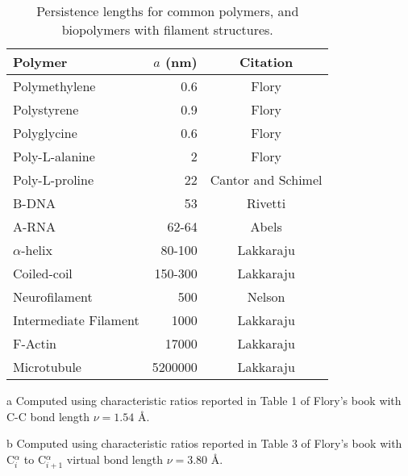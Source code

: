 \begin{table}[htbp]
\begin{center}
\begin{threeparttable}
\begin{tabular}{l|r|c}
\hline
Polymer               & $a$ (nm) & Citation  \\ \hline
Polymethylene         & 0.6      & Flory\tnote{a}      \\  
Polystyrene           & 0.9      & Flory\tnote{a}      \\
Polyglycine           & 0.6      & Flory \tnote{b}     \\
Poly-L-alanine        & 2        & Flory \tnote{b}     \\
Poly-L-proline        & 22       & Cantor and Schimel \cite{cantor1980} \\
B-DNA                 & 53       & Rivetti \cite{rivetti1996}     \\
A-RNA                 & 62-64    & Abels     \cite{abels2005}     \\
$\alpha$-helix        & 80-100   & Lakkaraju \cite{lakkaraju2009} \\
Coiled-coil           & 150-300  & Lakkaraju \cite{lakkaraju2009} \\
Neurofilament         & 500      & Nelson    \cite{nelson2004}    \\
Intermediate Filament & 1000     & Lakkaraju \cite{lakkaraju2009} \\
F-Actin               & 17000    & Lakkaraju \cite{lakkaraju2009} \\
Microtubule           & 5200000  & Lakkaraju \cite{lakkaraju2009} \\
\hline
\end{tabular}
\begin{tablenotes}
\item [a] Computed using  characteristic ratios reported in Table 1
  of Flory's book \cite{flory1969} with C-C bond length $\nu = 1.54$ \AA.
\item [b] Computed using  characteristic ratios reported in Table 3
  of Flory's book \cite{flory1969} with C$^{\alpha}_{i}$ to C$^{\alpha}_{i+1}$ virtual
  bond length $\nu = 3.80$ \AA.
\end{tablenotes}
\end{threeparttable}
\caption{Persistence lengths for common polymers, and biopolymers with
  filament structures.}
\label{tab:perval}
\end{center}
\end{table}

